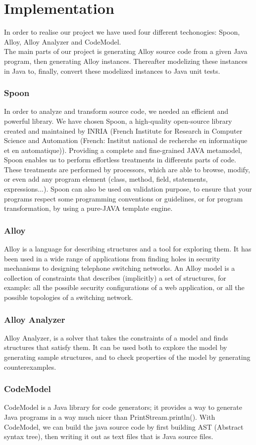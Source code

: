 \section{Implementation}
\label{sec:Implementation}
In order to realise our project we have used four different techonogies: Spoon, Alloy, Alloy Analyzer and CodeModel.\\
The main parts of our project is generating Alloy source code from a given Java program, then generating Alloy instances. Thereafter modelizing these instances in Java to, finally, convert these modelized instances to Java unit tests.

\subsubsection{Spoon}
In order to analyze and transform source code, we needed an efficient and powerful library.
We have chosen Spoon, a high-quality open-source library created and maintained by INRIA
(French Institute for Research in Computer Science and Automation (French: Institut national
de recherche en informatique et en automatique)). Providing a complete and fine-grained
JAVA metamodel, Spoon enables us to perform effortless treatments in differents parts of code.
These treatments are performed by processors, which are able to browse, modify, or even add
any program element (class, method, field, statements, expressions...).\cite{spoon-gforge}\cite{spoon-hal}
Spoon can also be used on validation purpose, to ensure that your programs respect some
programming conventions or guidelines, or for program transformation, by using a pure-JAVA
template engine.\cite{spoon-javasource}
\subsubsection{Alloy}
Alloy is a language for describing structures and a tool for exploring them. It has been used in a wide range of applications from finding holes in security mechanisms to designing telephone switching networks.
An Alloy model is a collection of constraints that describes (implicitly) a set of structures, for example: all the possible security configurations of a web application, or all the possible topologies of a switching network.\cite{alloy}

\subsubsection{Alloy Analyzer}
Alloy Analyzer, is a solver that takes the constraints of a model and finds structures that satisfy them. It can be used both to explore the model by generating sample structures, and to check properties of the model by generating counterexamples.\cite{alloy}

\subsubsection{CodeModel}
CodeModel is a Java library for code generators; it provides a way to generate Java programs in a way much nicer than PrintStream.println().
With CodeModel, we can build the java source code by first building AST (Abstract syntax tree)\cite{ast}, then writing it out as text files that is Java source files.\cite{codeModel}